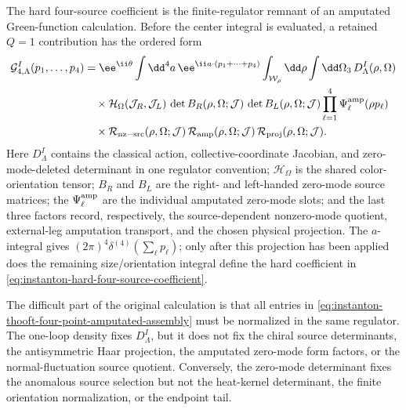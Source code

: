 \begin{controlledapproximation}
\label{ca:instanton-thooft-four-point-amputated-assembly}
The hard four-source coefficient is the finite-regulator remnant of an
amputated Green-function calculation.  Before the center integral is
evaluated, a retained \(Q=1\) contribution has the ordered form
\begin{equation}
\begin{aligned}
  \mathcal G_{4,\Lambda}^{I}(p_1,\ldots,p_4)
  &=
  \ee^{\ii\theta}
  \int
  \dd^4a\,\ee^{\ii a\cdot(p_1+\cdots+p_4)}
  \int_{\mathcal W_\rho}
  \dd\rho\int\dd\Omega_{3}\,
  D_{\Lambda}^{I}(\rho,\Omega)                         \\
  &\quad{}\times
  \mathcal H_{\Omega}(\mathcal J_R,\mathcal J_L)\,
  \det B_R(\rho,\Omega;\mathcal J)\,
  \det B_L(\rho,\Omega;\mathcal J)
  \prod_{\ell=1}^{4}
    \Psi_{\ell}^{\rm amp}(\rho p_\ell)                  \\
  &\quad{}\times
  \mathcal R_{\rm nz-src}(\rho,\Omega;\mathcal J)\,
  \mathcal R_{\rm amp}(\rho,\Omega;\mathcal J)\,
  \mathcal R_{\rm proj}(\rho,\Omega;\mathcal J).
\end{aligned}
  \label{eq:instanton-thooft-four-point-amputated-assembly}
\end{equation}
Here \(D_{\Lambda}^{I}\) contains the classical action, collective-coordinate
Jacobian, and zero-mode-deleted determinant in one regulator convention;
\(\mathcal H_{\Omega}\) is the shared color-orientation tensor; \(B_R\) and
\(B_L\) are the right- and left-handed zero-mode source matrices; the
\(\Psi_{\ell}^{\rm amp}\) are the individual amputated zero-mode slots; and
the last three factors record, respectively, the source-dependent nonzero-mode
quotient, external-leg amputation transport, and the chosen physical
projection.  The \(a\)-integral gives
\((2\pi)^4\delta^{(4)}(\sum_\ell p_\ell)\); only after this projection has
been applied does the remaining size/orientation integral define the hard
coefficient in \eqref{eq:instanton-hard-four-source-coefficient}.

The difficult part of the original calculation is that all entries in
\eqref{eq:instanton-thooft-four-point-amputated-assembly} must be normalized
in the same regulator.  The one-loop density fixes \(D_{\Lambda}^{I}\), but
it does not fix the chiral source determinants, the antisymmetric Haar
projection, the amputated zero-mode form factors, or the normal-fluctuation
source quotient.  Conversely, the zero-mode determinant fixes the anomalous
source selection but not the heat-kernel determinant, the finite orientation
normalization, or the endpoint tail.


\end{controlledapproximation}
